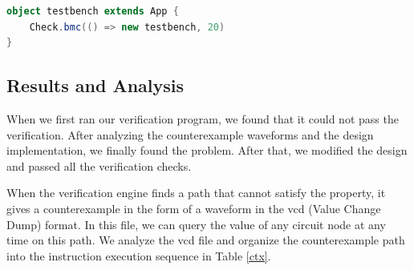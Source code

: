 \documentclass[conference]{IEEEtran}
\theoremstyle{definition}
\begin{document}
\begin{lstlisting}[language=scala, caption={A Code Snippet to Call Verification Process}, label=checkcode]
object testbench extends App {
    Check.bmc(() => new testbench, 20)
}
\end{lstlisting}    

\subsection{Results and Analysis}
When we first ran our verification program, we found that it could not pass the verification.
After analyzing the counterexample waveforms and the design implementation, we finally found the problem.
After that, we modified the design and passed all the verification checks.

When the verification engine finds a path that cannot satisfy the property, it gives a counterexample in the form of a waveform in the vcd (Value Change Dump) format.
In this file, we can query the value of any circuit node at any time on this path.
We analyze the vcd file and organize the counterexample path into the instruction execution sequence in Table \ref{ctx}.
\end{document}
